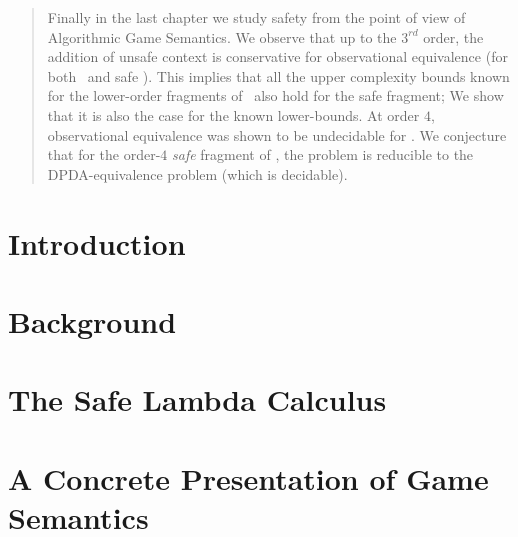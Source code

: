 \documentclass[11pt,a4paper,twoside,openright,draft]{myown}
\begin{document}
\begin{abstract}
Finally in the last chapter we study safety from the point of view of Algorithmic Game Semantics.  We observe that up to the $3^{rd}$ order, the addition of unsafe context is conservative for observational equivalence (for both \ialgol\ and safe \ialgol). This implies that all the upper complexity bounds known for the lower-order fragments of \ialgol\ also hold for the safe fragment; We show that it is also the case for the known lower-bounds. At order $4$, observational equivalence was shown to be undecidable for \ialgol.
We conjecture that for the order-$4$ \emph{safe} fragment of \ialgol, the problem is reducible to the DPDA-equivalence problem (which is decidable).

\end{abstract}

\begin{romanpages}
\tableofcontents
\listoffigures
\listoftables
\end{romanpages}

\ifdraftmode\listoftodos\bigskip\fi

%

\chapter{Introduction}
    


\chapter{Background}
\label{chap:background}
    

\chapter{The Safe Lambda Calculus}
\label{chap:safelambda}
    
    
    
    
    
    
    


\chapter{A Concrete Presentation of Game Semantics}
    \label{chap:concrete_gamesem}
    
\end{document}
